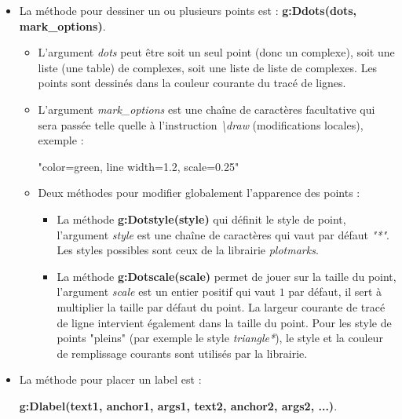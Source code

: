 \documentclass[%
10pt,%
a4paper,%
french,%
]%
{article}%
\begin{document}
\begin{itemize}
\item La méthode pour dessiner un ou plusieurs points est : \textbf{g:Ddots(dots, mark\_options)}.

    \begin{itemize}
    \item L'argument \emph{dots} peut être soit un seul point (donc un complexe), soit une liste (une table) de complexes, soit une liste  de liste de complexes. Les points sont dessinés dans la couleur courante du tracé de lignes.
    \item L'argument \emph{mark\_options} est une chaîne de caractères facultative qui sera passée telle quelle à l'instruction \emph{\textbackslash draw} (modifications locales), exemple :
\begin{TeXcode}
    "color=green, line width=1.2, scale=0.25"
\end{TeXcode}

    \item  Deux méthodes pour modifier globalement l'apparence des points :
        \begin{itemize}
        \item La méthode \textbf{g:Dotstyle(style)} qui définit le style de point, l'argument \emph{style} est une chaîne de caractères qui vaut par défaut \emph{"*"}. Les styles possibles sont ceux de la librairie \emph{plotmarks}.
        \item La méthode \textbf{g:Dotscale(scale)} permet de jouer sur la taille du point, l'argument \emph{scale} est un entier positif qui vaut $1$ par défaut, il sert à multiplier la taille par défaut du point. La largeur courante de tracé de ligne intervient également dans la taille du point. Pour les style de points "pleins" (par exemple le style \emph{triangle*}), le style et la couleur de remplissage courants sont utilisés par la librairie.
        \end{itemize}
    \end{itemize}
    
\item La méthode pour placer un label est : 

\hfil\textbf{g:Dlabel(text1, anchor1, args1, text2, anchor2, args2, ...)}.\hfil


\end{itemize}
\end{document}
